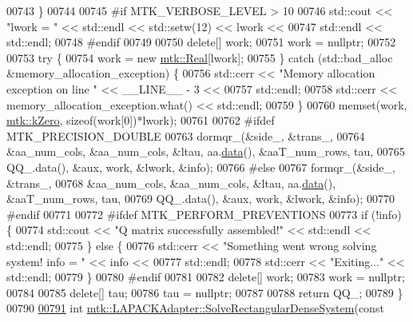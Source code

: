 \begin{DoxyCode}
00743   \}
00744 
00745 \textcolor{preprocessor}{  #if MTK\_VERBOSE\_LEVEL > 10}
00746   std::cout << \textcolor{stringliteral}{"lwork = "} << std::endl << std::setw(12) << lwork <<
00747     std::endl << std::endl;
00748 \textcolor{preprocessor}{  #endif}
00749 
00750   \textcolor{keyword}{delete}[] work;
00751   work = \textcolor{keyword}{nullptr};
00752 
00753   \textcolor{keywordflow}{try} \{
00754     work = \textcolor{keyword}{new} \hyperlink{group__c01-roots_gac080bbbf5cbb5502c9f00405f894857d}{mtk::Real}[lwork];
00755   \} \textcolor{keywordflow}{catch} (std::bad\_alloc &memory\_allocation\_exception) \{
00756     std::cerr << \textcolor{stringliteral}{"Memory allocation exception on line "} << \_\_LINE\_\_ - 3 <<
00757       std::endl;
00758     std::cerr << memory\_allocation\_exception.what() << std::endl;
00759   \}
00760   memset(work, \hyperlink{group__c01-roots_ga59a451a5fae30d59649bcda274fea271}{mtk::kZero}, \textcolor{keyword}{sizeof}(work[0])*lwork);
00761 
00762 \textcolor{preprocessor}{  #ifdef MTK\_PRECISION\_DOUBLE}
00763   dormqr\_(&side\_, &trans\_,
00764           &aa\_num\_cols, &aa\_num\_cols, &ltau, aa.\hyperlink{classmtk_1_1DenseMatrix_a0c33b8a9e01d157c61ddbdf807c25d84}{data}(), &aaT\_num\_rows, tau,
00765           QQ\_.data(), &aux, work, &lwork, &info);
00766 \textcolor{preprocessor}{  #else}
00767   formqr\_(&side\_, &trans\_,
00768           &aa\_num\_cols, &aa\_num\_cols, &ltau, aa.\hyperlink{classmtk_1_1DenseMatrix_a0c33b8a9e01d157c61ddbdf807c25d84}{data}(), &aaT\_num\_rows, tau,
00769           QQ\_.data(), &aux, work, &lwork, &info);
00770 \textcolor{preprocessor}{  #endif}
00771 
00772 \textcolor{preprocessor}{  #ifdef MTK\_PERFORM\_PREVENTIONS}
00773   \textcolor{keywordflow}{if} (!info) \{
00774     std::cout << \textcolor{stringliteral}{"Q matrix successfully assembled!"} << std::endl << std::endl;
00775   \} \textcolor{keywordflow}{else} \{
00776     std::cerr << \textcolor{stringliteral}{"Something went wrong solving system! info = "} << info <<
00777       std::endl;
00778     std::cerr << \textcolor{stringliteral}{"Exiting..."} << std::endl;
00779   \}
00780 \textcolor{preprocessor}{  #endif}
00781 
00782   \textcolor{keyword}{delete}[] work;
00783   work = \textcolor{keyword}{nullptr};
00784 
00785   \textcolor{keyword}{delete}[] tau;
00786   tau = \textcolor{keyword}{nullptr};
00787 
00788   \textcolor{keywordflow}{return} QQ\_;
00789 \}
00790 
\hypertarget{mtk__lapack__adapter_8cc_source_l00791}{}\hyperlink{classmtk_1_1LAPACKAdapter_a380f148ffdf96bae2f79ae28f1a6560c}{00791} \textcolor{keywordtype}{int} \hyperlink{classmtk_1_1LAPACKAdapter_a380f148ffdf96bae2f79ae28f1a6560c}{mtk::LAPACKAdapter::SolveRectangularDenseSystem}(\textcolor{keyword}{const} 

\end{DoxyCode}
